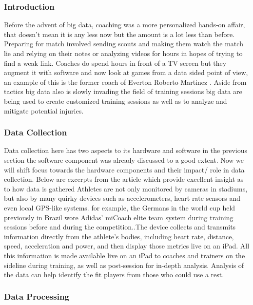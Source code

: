 \documentclass[sigconf]{acmart}
\begin{document}
\subsubsection{Introduction}

Before the advent of big data, coaching was a more personalized hands-on affair, that doesn’t mean it is any less now but the amount is a lot less than before. Preparing for match involved sending scouts and making them watch the match lie and relying on their notes or analyzing videos for hours in hopes of trying to find a weak link. Coaches do spend hours in front of a TV screen but they augment it with software and now look at games from a data sided point of view, an example of this is the former coach of Everton Roberto Martinez \cite{2012}. Aside from tactics big data also is slowly invading the field of training sessions big data are being used to create customized training sessions as well as to analyze and mitigate potential injuries.

\subsubsection{Data Collection}

Data collection here has two aspects to its hardware and software in the previous section the software component was already discussed to a good extent. Now we will shift focus towards the hardware components and their impact/ role in data collection. Below are excerpts from the article \cite{Rejec2000s} which provide excellent insight as to how data is gathered \newline
Athletes are not only monitored by cameras in stadiums, but also by many quirky devices such as accelerometers, heart rate sensors and even local GPS-like systems. for example, the Germans in the world cup held previously in Brazil wore Adidas’ miCoach elite team system during training sessions before and during the competition.\cite{Rejec2000s}.The device collects and transmits information directly from the athlete’s bodies, including heart rate, distance, speed, acceleration and power, and then display those metrics live on an iPad. All this information is made available live on an iPad to coaches and trainers on the sideline during training, as well as post-session for in-depth analysis. Analysis of the data can help identify the fit players from those who could use a rest.\newline

\subsubsection{Data Processing}
\end{document}
